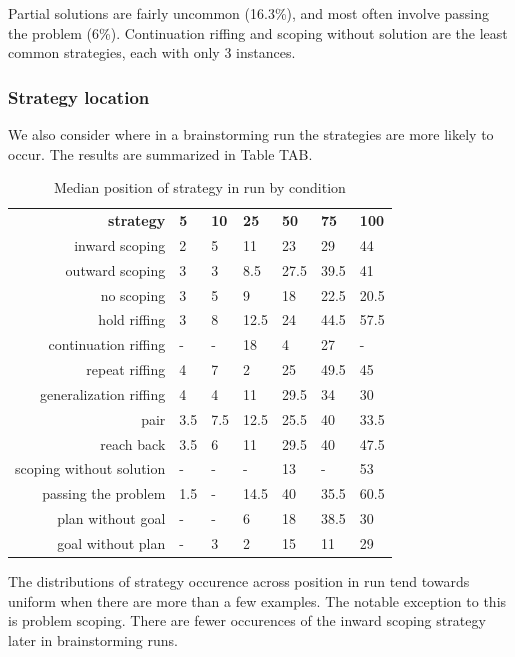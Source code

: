 Partial solutions are fairly uncommon (16.3\%), and most often involve passing the problem (6\%). Continuation riffing and scoping without solution are the least common strategies, each with only 3 instances.

\subsubsection{Strategy location}

We also consider where in a brainstorming run the strategies are more likely to occur. The results are summarized in Table TAB.

\begin{table}
    \begin{tabular}{r | l l l l l l}
        \textbf{strategy} & \textbf{5} & \textbf{10} & \textbf{25} & \textbf{50} & \textbf{75} & \textbf{100} \\
        inward scoping & 2 & 5 & 11 & 23 & 29 & 44 \\
        outward scoping & 3 & 3 & 8.5 & 27.5 & 39.5 & 41 \\
        no scoping & 3 & 5 & 9 & 18 & 22.5 & 20.5 \\
        \hline \hline
        hold riffing & 3 & 8 & 12.5 & 24 & 44.5 & 57.5 \\
        continuation riffing & - & - & 18 & 4 & 27 & - \\
        repeat riffing & 4 & 7 & 2 & 25 & 49.5 & 45 \\
        generalization riffing & 4 & 4 & 11 & 29.5 & 34 & 30 \\
        \hline
        pair & 3.5 & 7.5 & 12.5 & 25.5 & 40 & 33.5 \\
        reach back & 3.5 & 6 & 11 &29.5 & 40 & 47.5 \\
        \hline \hline
        scoping without solution & - & - & - & 13 & - & 53 \\
        passing the problem & 1.5 & - & 14.5 & 40 & 35.5 & 60.5  \\
        plan without goal & - & - & 6 & 18 & 38.5 & 30 \\
        goal without plan & - & 3 & 2 & 15 & 11 & 29 \\ 
    \end{tabular}
    \caption{Median position of strategy in run by condition}
\end{table}

The distributions of strategy occurence across position in run tend towards uniform when there are more than a few examples. The notable exception to this is problem scoping. There are fewer occurences of the inward scoping strategy later in brainstorming runs.

